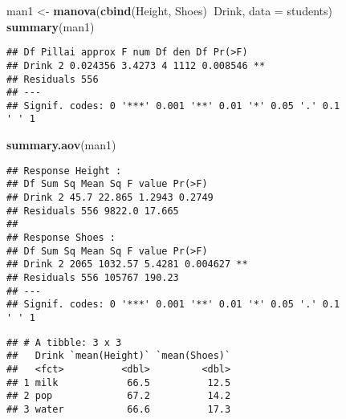 \documentclass[]{article}
\newenvironment{Shaded}{\begin{snugshade}}{\end{snugshade}}
\newcommand{\DataTypeTok}[1]{\textcolor[rgb]{0.13,0.29,0.53}{#1}}
\newcommand{\KeywordTok}[1]{\textcolor[rgb]{0.13,0.29,0.53}{\textbf{#1}}}
\newcommand{\NormalTok}[1]{#1}
\newcommand{\OperatorTok}[1]{\textcolor[rgb]{0.81,0.36,0.00}{\textbf{#1}}}
\newcommand{\StringTok}[1]{\textcolor[rgb]{0.31,0.60,0.02}{#1}}
\begin{document}
\begin{Shaded}
\begin{Highlighting}[]
\NormalTok{man1 <-}\StringTok{ }\KeywordTok{manova}\NormalTok{(}\KeywordTok{cbind}\NormalTok{(Height, Shoes)}\OperatorTok{~}\NormalTok{Drink, }\DataTypeTok{data =}\NormalTok{ students)}
\KeywordTok{summary}\NormalTok{(man1)}
\end{Highlighting}
\end{Shaded}

\begin{verbatim}
## Df Pillai approx F num Df den Df Pr(>F)
## Drink 2 0.024356 3.4273 4 1112 0.008546 **
## Residuals 556
## ---
## Signif. codes: 0 '***' 0.001 '**' 0.01 '*' 0.05 '.' 0.1
' ' 1
\end{verbatim}

\begin{Shaded}
\begin{Highlighting}[]
\KeywordTok{summary.aov}\NormalTok{(man1)}
\end{Highlighting}
\end{Shaded}

\begin{verbatim}
## Response Height :
## Df Sum Sq Mean Sq F value Pr(>F)
## Drink 2 45.7 22.865 1.2943 0.2749
## Residuals 556 9822.0 17.665
##
## Response Shoes :
## Df Sum Sq Mean Sq F value Pr(>F)
## Drink 2 2065 1032.57 5.4281 0.004627 **
## Residuals 556 105767 190.23
## ---
## Signif. codes: 0 '***' 0.001 '**' 0.01 '*' 0.05 '.' 0.1
' ' 1
\end{verbatim}

\begin{Shaded}
\end{Shaded}

\begin{verbatim}
## # A tibble: 3 x 3
##   Drink `mean(Height)` `mean(Shoes)`
##   <fct>          <dbl>         <dbl>
## 1 milk            66.5          12.5
## 2 pop             67.2          14.2
## 3 water           66.6          17.3
\end{verbatim}

\begin{Shaded}
\end{Shaded}
\end{document}
